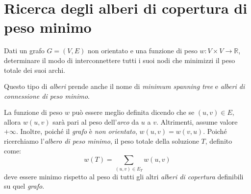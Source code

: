 \section{Ricerca degli alberi di copertura di peso minimo}
\begin{problem}
    Dati un grafo $G=(V,E)$ non orientato e una funzione di peso $w:V\times
    V\to\mathbb{R}$, determinare il modo di interconnettere tutti i suoi
    nodi che minimizzi il peso totale dei suoi archi.
\end{problem}
\begin{note}
    Questo tipo di \emph{alberi} prende anche il nome di \emph{minimum spanning
    tree} e \emph{alberi di connessione di peso minimo}.
\end{note}

\noindent
La funzione di peso $w$ può essere meglio definita dicendo che se $(u,v)\in E$,
allora $w(u,v)$ sarà pari al peso dell'\emph{arco} da $u$ a $v$. Altrimenti,
assume valore $+\infty$. Inoltre, poiché il \emph{grafo} è \emph{non orientato},
$w(u,v)=w(v,u)$. Poiché ricerchiamo l'\emph{albero di peso minimo}, il peso totale
della soluzione $T$, definito come:
\[w(T)=\sum_{(u,v)\in E_T}w(u,v)\]
deve essere minimo rispetto al peso di tutti gli altri \emph{alberi di copertura}
definibili su quel \emph{grafo}.


